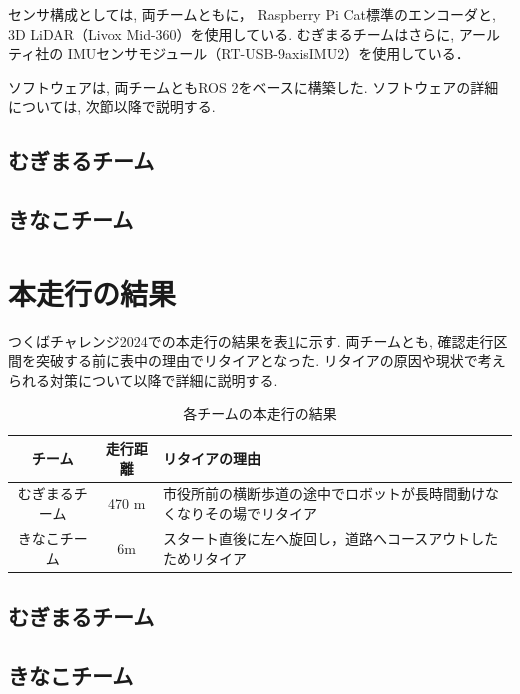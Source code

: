 \documentclass[twocolumn,9pt]{jsproceedings}
\begin{document}
センサ構成としては, 両チームともに，
Raspberry Pi Cat標準のエンコーダと, 
3D LiDAR（Livox Mid-360）を使用している. 
むぎまるチームはさらに, アールティ社の 
IMUセンサモジュール（RT-USB-9axisIMU2\cite{RTshopIMU}）を使用している．

ソフトウェアは, 
両チームともROS 2\cite{ROS 2}をベースに構築した. 
ソフトウェアの詳細については, 
次節以降で説明する. 


\subsection{むぎまるチーム}



\subsection{きなこチーム}\label{sub:localization}



\section{本走行の結果}

つくばチャレンジ2024での本走行の結果を表\ref{MainRun}に示す. 
両チームとも, 確認走行区間を突破する前に表中の理由でリタイアとなった. 
リタイアの原因や現状で考えられる対策について以降で詳細に説明する. 
\begin{table}[H]
  \caption{各チームの本走行の結果}
  \label{MainRun}
  \begin{tabular}{|c|c|p{4.0cm}|}
    \hline
    チーム         & 走行距離 & リタイアの理由\\
    \hline
    むぎまるチーム & 470 m    & 市役所前の横断歩道の途中でロボットが長時間動けなくなりその場でリタイア\\
    \hline

    きなこチーム　 & 6m    & スタート直後に左へ旋回し，道路へコースアウトしたためリタイア \\
    \hline
  \end{tabular}
\end{table}

\subsection{むぎまるチーム}


\subsection{きなこチーム}

\end{document}
